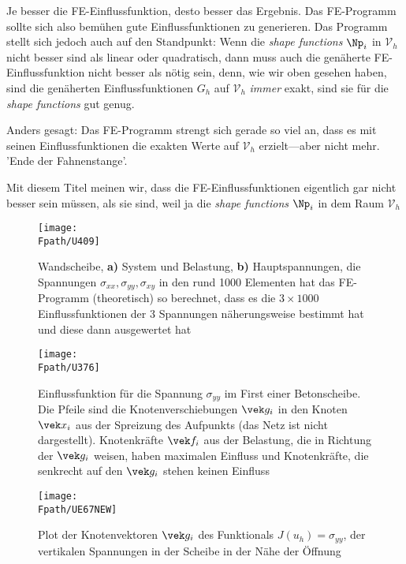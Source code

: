 {{{Je besser die FE-Einflussfunktion, desto besser das Ergebnis. Das FE-Programm sollte sich also bem\"{u}hen gute Einflussfunktionen zu generieren. Das Programm stellt sich jedoch auch auf den Standpunkt: Wenn die {\em shape functions\/} $\Np_i$ in $\mathcal{V}_h$ nicht besser sind als linear oder quadratisch, dann muss auch die gen\"{a}herte FE-Einflussfunktion nicht besser als n\"{o}tig sein, denn, wie wir oben gesehen haben, sind die gen\"{a}herten Einflussfunktionen $G_h$ auf $\mathcal{V}_h$ {\em immer \/} exakt, sind sie f\"{u}r die {\em shape functions\/} gut genug.

Anders gesagt: Das FE-Programm strengt sich gerade so viel an, dass es mit seinen Einflussfunktionen die exakten Werte auf $\mathcal{V}_h$ erzielt---aber nicht mehr. 'Ende der Fahnenstange'.

Mit diesem Titel meinen wir, dass die FE-Einflussfunktionen eigentlich gar nicht besser sein m\"{u}ssen, als sie sind, weil ja die {\em shape functions\/} $\Np_i$ in dem Raum $\mathcal{V}_h$

\begin{figure}[tbp]
\centering
\if {} \sidecaption[t] \fi
\texttt{[image: \\Fpath/U409]}
\caption{Wandscheibe, \textbf{a)} System und Belastung,  \textbf{ b)} Hauptspannungen, die Spannungen $\sigma_{xx}, \sigma_{yy}, \sigma_{xy} $ in den rund 1000 Elementen hat das FE-Programm (theoretisch) so berechnet, dass es die $3 \times 1000$ Einflussfunktionen der 3 Spannungen n\"{a}herungsweise bestimmt hat und diese dann ausgewertet hat} \label{U409}
\end{figure}%

\begin{figure}
\centering
{\texttt{[image: \\Fpath/U376]}}
  \caption{Einflussfunktion f\"{u}r die Spannung $\sigma_{yy}$ im First einer Betonscheibe. Die Pfeile sind die Knotenverschiebungen $\vek g_i$ in den Knoten $\vek x_i$ aus der Spreizung des Aufpunkts (das Netz ist nicht dargestellt). Knotenkr\"{a}fte $\vek f_i$ aus der Belastung, die in Richtung der $\vek g_i$ weisen, haben maximalen Einfluss und Knotenkr\"{a}fte, die senkrecht auf den $\vek g_i$ stehen keinen Einfluss} \label{U277}
\end{figure}

\begin{figure}
\centering
{\texttt{[image: \\Fpath/UE67NEW]}}
  \caption{Plot der Knotenvektoren $\vek g_i$ des Funktionals $J(u_h) = \sigma_{yy}$, der vertikalen Spannungen in der Scheibe in der N\"{a}he der \"{O}ffnung}
  \label{U67}
\end{figure}%

}}}
